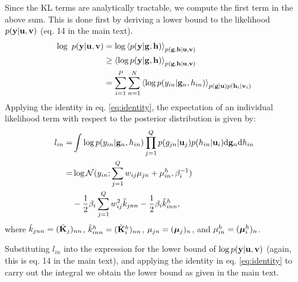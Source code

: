 \documentclass[]{article}
\begin{document}
Since the KL terms are analytically tractable, we compute the first term in the above sum. 
This is done first by deriving a lower bound to the likelihood $p(\mathbf{y} | \mathbf{u}, \mathbf{v})$ (eq. 14 in the main text).
\begin{align}
\nonumber
\log \text{ } p(\mathbf{y} | \mathbf{u}, \mathbf{v})
&= \log \left\langle p(\mathbf{y} | \mathbf{g}, \mathbf{h}) \right\rangle_{p(\mathbf{g},\mathbf{h} | \mathbf{u}, \mathbf{v})} \\
\nonumber
&\ge \left\langle \log p(\mathbf{y} | \mathbf{g}, \mathbf{h}) \right\rangle_{p(\mathbf{g},\mathbf{h} | \mathbf{u}, \mathbf{v})}  \\
\nonumber
&= \sum_{i=1}^P \sum_{n=1}^N \left\langle \log p(y_{in} | \mathbf{g}_n, h_{in})  \right\rangle_{p(\mathbf{g} | \mathbf{u}) p(\mathbf{h}_i | \mathbf{v}_i)} 
\end{align}
Applying the identity in eq. \ref{eq:identity}, 
the expectation of an individual likelihood term with respect to the posterior distribution is given by: 
\begin{align}
\nonumber
l_{in} =& \int \log p(y_{in} | \mathbf{g}_n, h_{in}) \prod_{j=1}^Q p(g_{jn} | \mathbf{u}_j) p(h_{in} | \mathbf{u}_i) \mathrm{d} \mathbf{g}_n \mathrm{d} h_{in} \\
\nonumber
=& \log \mathcal{N}(y_{in}; \sum_{j=1}^Q w_{ij} \mu_{jn}+ \mu^h_{in}, \beta_i^{-1}) \\
&- \frac{1}{2} \beta_i \sum_{j=1}^Q w_{ij}^2 \tilde{k}_{jnn} 
- \frac{1}{2} \beta_i \tilde{k}^h_{inn},
\end{align}
where $\tilde{k}_{jnn} = (\tilde{\mathbf{K}}_j)_{nn}$, $\tilde{k}^h_{inn} = (\tilde{\mathbf{K}}^h_i)_{nn}$, $\mu_{jn} = (\boldsymbol{\mu}_j)_n$, and $\mu^h_{in} = (\boldsymbol{\mu}^h_i)_n$.

Substituting $l_{in}$ into the expression for the lower bound of $\log p(\mathbf{y} | \mathbf{u}, \mathbf{v})$ (again, this is eq. 14 in the main text), and applying the identity in eq. \ref{eq:identity} to carry out the integral we obtain the lower bound as given in the main text.

\end{document}
